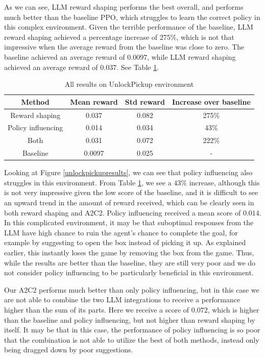 \documentclass[conference]{IEEEtran}
\begin{document}
As we can see, LLM reward shaping performs the best overall, and performs much better than the baseline PPO, which struggles to learn the correct policy in this complex environment. Given the terrible performance of the baseline, LLM reward shaping achieved a percentage increase of $275\%$, which is not that impressive when the average reward from the baseline was close to zero. The baseline achieved an average reward of $0.0097$, while LLM reward shaping achieved an average reward of $0.037$. See Table \ref{unlockpickuptable}.

\begin{table}[h]
\caption{All results on UnlockPickup environment}
\begin{center}
\label{unlockpickuptable}
\begin{tabular}{c | c c c}
Method & Mean reward & Std reward & Increase over baseline \\
\hline
Reward shaping & 0.037 & 0.082 & 275\% \\
Policy influencing & 0.014 & 0.034 & 43\% \\
Both & 0.031 & 0.072 & 222\% \\
Baseline & 0.0097 & 0.025 & - \\
\end{tabular}
\end{center}
\end{table}

Looking at Figure \ref{unlockpickupresults}, we can see that policy influencing also struggles in this environment. From Table \ref{unlockpickuptable}, we see a $43\%$ increase, although this is not very impressive given the low score of the baseline, and it is difficult to see an upward trend in the amount of reward received, which can be clearly seen in both reward shaping and A2C2. Policy influencing received a mean score of $0.014$. In this complicated environment, it may be that suboptimal responses from the LLM have high chance to ruin the agent's chance to complete the goal, for example by suggesting to open the box instead of picking it up. As explained earlier, this instantly loses the game by removing the box from the game. Thus, while the results are better than the baseline, they are still very poor and we do not consider policy influencing to be particularly beneficial in this environment.

Our A2C2 performs much better than only policy influencing, but in this case we are not able to combine the two LLM integrations to receive a performance higher than the sum of its parts. Here we receive a score of $0.072$, which is higher than the baseline and policy influencing, but not higher than reward shaping by itself. It may be that in this case, the performance of policy influencing is so poor that the combination is not able to utilize the best of both methods, instead only being dragged down by poor suggestions.
\end{document}
